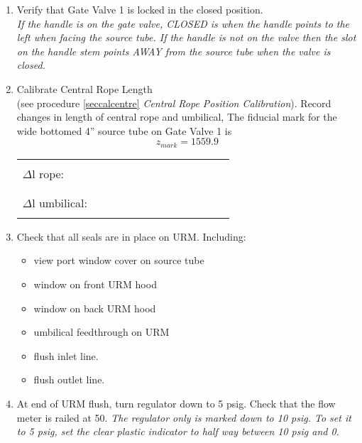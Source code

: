 \begin{enumerate}
   
\item\checkbox Verify that Gate Valve 1 is locked in the  closed position.\\
   \small
   {\em
     If the handle is on the gate valve, CLOSED is when the  handle points to 
     the left when facing the source tube.  If the handle is not on the valve
     then the slot on the handle stem points AWAY from the source tube when
     the valve is closed.
   }
   \normalsize
 
\item \checkbox Calibrate Central Rope Length\\
      (see procedure  \ref{seccalcentre} 
       {\em Central Rope Position Calibration}).
      Record changes in length of central rope and umbilical,
      The fiducial mark for the wide bottomed 4'' source tube on Gate Valve 1
      is
      \[
               z_{mark} = 1559.9
      \]
     \begin{center}
     \begin{tabular}{|l|}
     \hline
      \\
     $\Delta$l rope:~~~~~~~~~~~~~~~~~~~~~~~~\\
      \\
     \hline
      \\
     $\Delta$l umbilical:~~~~~~~~~~~~~~~~~~~~~~~~\\
      \\
     \hline
     \end{tabular}
     \end{center}


\item\checkbox Check that all seals are in place on URM.  Including:
   \begin{itemize}
      \item\checkbox view port window cover on source tube
      \item\checkbox window on front URM hood
      \item\checkbox window on back URM hood
      \item\checkbox umbilical feedthrough on URM
      \item\checkbox flush inlet line.
      \item\checkbox flush outlet line.
   \end{itemize}


\item\checkbox At end of URM flush, turn regulator down to 5 psig.
   Check that the flow meter is railed at 50.
   \small
   {\em
     The regulator only is marked down to 10 psig.  To set it to 5 psig,
     set the clear plastic indicator to half way between 10 psig and 0.
   }
   \normalsize
  


\end{enumerate}
